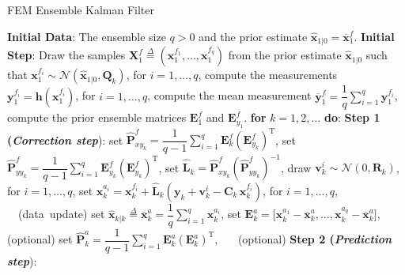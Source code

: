 \documentclass[journal]{IEEEtran}
\newcommand{\mb}{\mathbf}
\begin{document}
\begin{algorithm}[t!]
\caption{FEM Ensemble Kalman Filter}
\begin{algorithmic} \label{alg:2}
\STATE \textbf{Initial Data}: The ensemble size $q > 0$ and the prior estimate $\hat{\mb{x}}_{1|0} = \overline{\mb{x}}_{1}^{f}$. 
\STATE \textbf{Initial Step}:
\STATE  Draw the samples $\mb{X}_{1}^{f} \overset{\Delta}{=} (\textbf{x}_{1}^{f_{1}},\dots,\textbf{x}_{1}^{f_{q}})$ from the prior estimate $\hat{\mb{x}}_{1|0}$ such that $\textbf{x}_{1}^{f_{i}}\sim\mathcal{N}(\hat{\mb{x}}_{1|0},\mb{Q}_{k})$, for $i=1,\dots,q$, 
 \STATE compute the measurements $\mb{y}_{1}^{f_i} = \mb{h}(\textbf{x}_{1}^{f_{i}})$, for $i=1,\dots,q$, 
 \STATE compute the mean measurement $\overline{\mb{y}}_{1}^{f} = \dfrac{1}{q}\sum_{i=1}^{q}\mb{y}_{1}^{f_{i}}$, 
 \STATE compute the prior ensemble matrices $\mb{E}_{1}^{f}$ and $\mb{E}_{{y}_1}^{f}$.
\STATE  \textbf{for} $k=1,2,\dots$ \textbf{do}: 
\STATE\hspace{.5cm} \textbf{Step 1 (\textit{Correction step}}): 
\STATE\hspace{.5cm} set $\hat{\mb{P}}_{{xy}_{k}}^{f} = \dfrac{1}{q-1}\sum_{i=1}^{q}\mb{E}_{k}^{f}(\mb{E}_{{y}_k}^{f})^{\mathrm{T}}$,
\STATE\hspace{.5cm} set $\hat{\mb{P}}_{{yy}_{k}}^{f} = \dfrac{1}{q-1}\sum_{i=1}^{q}\mb{E}_{{y}_k}^{f}(\mb{E}_{{y}_k}^{f})^{\mathrm{T}}$,
\STATE\hspace{.5cm} set $\hat{\mb{L}}_{k} = \hat{\mb{P}}_{{xy}_{k}}^{f}(\hat{\mb{P}}_{{yy}_{k}}^{f})^{-1}$,
\STATE\hspace{.5cm} draw $\textbf{v}_{k}^{i}\sim\mathcal{N}(0,\mb{R}_{k})$, for $i=1,\dots,q$,
\STATE\hspace{.5cm} set $\textbf{x}_{k}^{{a}_{i}} = \textbf{x}_{k}^{{f}_{i}} + \hat{\mb{L}}_{k}(\textbf{y}_{k} + \textbf{v}_{k}^{i} - \mb{C}_k \, \textbf{x}_{k}^{{f}_{i}})$, for $i=1,\dots,q$, \ \ \mbox{({data update})} 
\STATE\hspace{.5cm} set $\hat{\mb{x}}_{k|k} \overset{\Delta}{=} \overline{\mb{x}}_{k}^{a} = \dfrac{1}{q}\sum_{i=1}^{q}\mb{x}_{k}^{a_{i}}$,
\STATE\hspace{.5cm} set $\mb{E}_{k}^{a} = \big[ \textbf{x}_{k}^{a_{1}} - \overline{\mb{x}}_{k}^{a},\dots,\textbf{x}_{k}^{a_{q}} - \overline{\mb{x}}_{k}^{a} \big]$, \ \ \, (optional)
\STATE\hspace{.5cm} set $\hat{\mb{P}}_{k}^{a} = \dfrac{1}{q-1}\sum_{i=1}^{q}\mb{E}_{k}^{a}(\mb{E}_{k}^{a})^{\mathrm{T}}$, \ \ \, (optional) 
\STATE\hspace{.5cm}   \textbf{Step 2 (\textit{Prediction step}}):

\end{algorithmic}
\end{algorithm}
\end{document}
